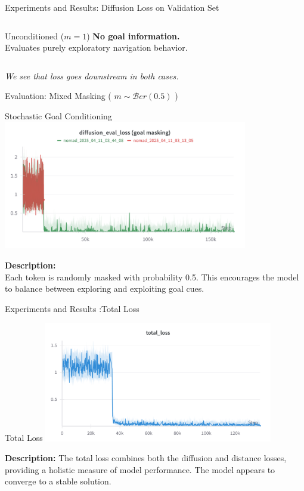 \documentclass{beamer}
\begin{document}
\begin{frame}{Experiments and Results: Diffusion Loss on Validation Set}
\begin{columns}
\begin{column}{0.48\textwidth}
\begin{block}{\centering Unconditioned ($m = 1$)}
                    \vspace{0.5em}
                    \tiny \textbf{No goal information.} \\
                    Evaluates purely exploratory navigation behavior.
                \end{block}
            \end{column}
        \end{columns}
        
        \vspace{0.7em}
        \centering
        \small \textit{We see that loss goes downstream in both cases.}
    \end{frame}

    \begin{frame}{Evaluation: Mixed Masking ( $m \sim \mathcal{B}er(0.5)$ )}
        \begin{block}{Stochastic Goal Conditioning}
            \centering
            \includegraphics[width=0.8\textwidth]{images/diff_eval_goal_masking.png}
        \end{block}
        \textbf{Description:} \\
        Each token is randomly masked with probability 0.5. This encourages the model to balance between exploring and exploiting goal cues.
    \end{frame}
\begin{frame}{Experiments and Results :Total Loss}
    \begin{block}{Total Loss}
        \centering
        \includegraphics[width=0.75\textwidth]{images/total_loss.png}
        
        \vspace{0.5em}
        \small
        \textbf{Description:} 
        The total loss combines both the diffusion and distance losses, providing a holistic measure of model performance. The model appears to converge to a stable solution.
    \end{block}
\end{frame}
\end{document}
